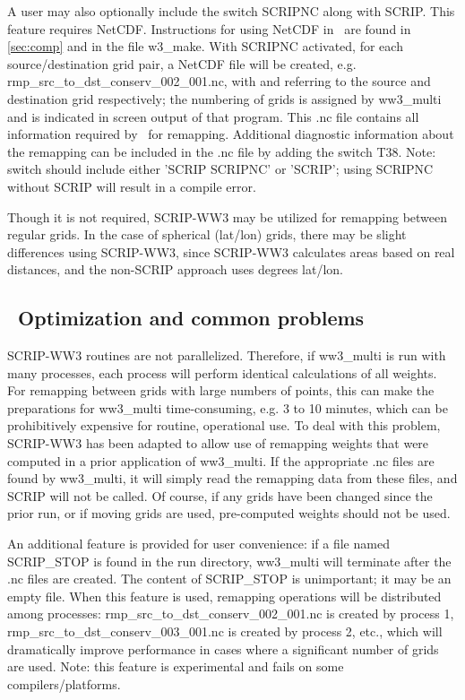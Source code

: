 A user may also optionally include the switch {\F SCRIPNC} along with {\F
  SCRIP}. This feature requires NetCDF. Instructions for using NetCDF in \ws\
are found in \para\ref{sec:comp} and in the file {\file w3\_make}. With {\F
  SCRIPNC} activated, for each source/destination grid pair, a NetCDF file
will be created, e.g. {\file rmp\_src\_to\_dst\_conserv\_002\_001.nc}, with
{\file 002} and {\file 001} referring to the source and destination grid
respectively; the numbering of grids is assigned by {\file ww3\_multi} and is
indicated in screen output of that program. This {\file .nc} file contains all
information required by \ws\ for remapping. Additional diagnostic information
about the remapping can be included in the {\file .nc} file by adding the
switch {\F T38}. Note: {\file switch} should include either {\F 'SCRIP
  SCRIPNC'} or {\F 'SCRIP'}; using {\F SCRIPNC} without {\F SCRIP} will result
in a compile error.

Though it is not required, SCRIP-WW3 may be utilized for remapping between
regular grids. In the case of spherical (lat/lon) grids, there may be slight
differences using SCRIP-WW3, since SCRIP-WW3 calculates areas based on real
distances, and the non-SCRIP approach uses degrees lat/lon.

\vssub
\subsection{~Optimization and common problems} \label{sec:scripD}
\vssub

SCRIP-WW3 routines are not parallelized. Therefore, if {\file ww3\_multi} is
run with many processes, each process will perform identical calculations of
all weights. For remapping between grids with large numbers of points, this
can make the preparations for {\file ww3\_multi} time-consuming, e.g. 3 to 10
minutes, which can be prohibitively expensive for routine, operational use. To
deal with this problem, SCRIP-WW3 has been adapted to allow use of remapping
weights that were computed in a prior application of {\file ww3\_multi}. If
the appropriate {\file .nc} files are found by {\file ww3\_multi}, it will
simply read the remapping data from these files, and SCRIP will not be
called. Of course, if any grids have been changed since the prior run, or if
moving grids are used, pre-computed weights should not be used.

An additional feature is provided for user convenience: if a file named {\file
  SCRIP\_STOP} is found in the run directory, {\file ww3\_multi} will
terminate after the {\file .nc} files are created. The content of {\file
  SCRIP\_STOP} is unimportant; it may be an empty file. When this feature is
used, remapping operations will be distributed among processes: {\file
  rmp\_src\_to\_dst\_conserv\_002\_001.nc} is created by process 1, {\file
  rmp\_src\_to\_dst\_conserv\_003\_001.nc} is created by process 2, etc.,
which will dramatically improve performance in cases where a significant
number of grids are used. Note: this feature is experimental and fails on some
compilers/platforms.


